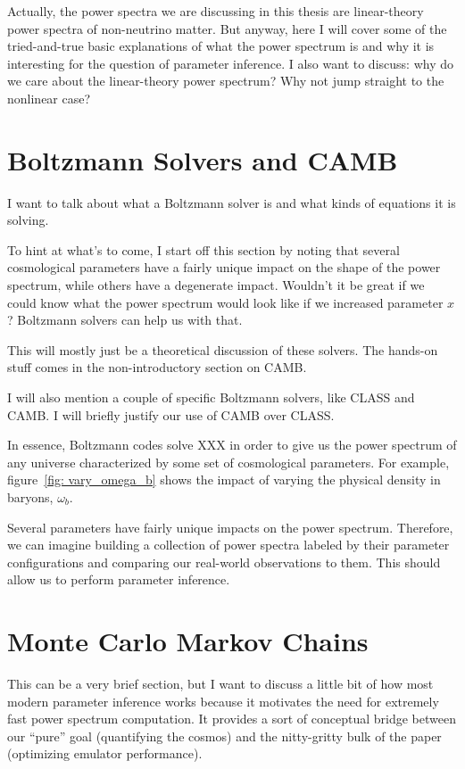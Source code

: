 Actually, the power spectra we are discussing in this thesis are linear-theory power spectra of non-neutrino matter. But anyway, here I will cover some of the tried-and-true basic explanations of what the power spectrum is and why it is interesting for the question of parameter inference. I also want to discuss: why do we care about the linear-theory power spectrum? Why not jump straight to the nonlinear case?

\section{Boltzmann Solvers and CAMB}

I want to talk about what a Boltzmann solver is and what kinds of equations it is solving.

To hint at what's to come, I start off this section by noting that several cosmological parameters have a fairly unique impact on the shape of the power spectrum, while others have a degenerate impact. Wouldn't it be great if we could know what the power spectrum would look like if we increased parameter $x$? Boltzmann solvers can help us with that.

This will mostly just be a theoretical discussion of these solvers. The hands-on stuff comes in the non-introductory section on CAMB.

I will also mention a couple of specific Boltzmann solvers, like CLASS and CAMB. I will briefly justify our use of CAMB over CLASS.


In essence, Boltzmann codes solve XXX in order to give us the power spectrum
of any universe characterized by some set of cosmological parameters. For
example, figure~\ref{fig: vary_omega_b} shows the impact of varying the
physical density in baryons, $\omega_b$. 

Several parameters have fairly unique impacts on the power spectrum.
Therefore, we can imagine building a collection of power spectra labeled by
their parameter configurations and comparing our real-world observations to
them. This should allow us to perform parameter inference.

\section{Monte Carlo Markov Chains}

This can be a very brief section, but I want to discuss a little bit of how most modern parameter inference works because it motivates the need for extremely fast power spectrum computation. It provides a sort of conceptual bridge between our ``pure'' goal (quantifying the cosmos) and the nitty-gritty bulk of the paper (optimizing emulator performance).


